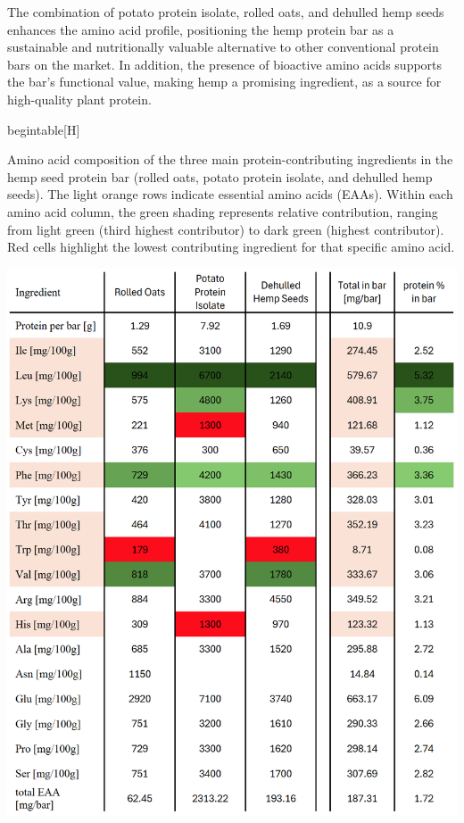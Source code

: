 \vspace{1em}
The combination of potato protein isolate, rolled oats, and dehulled hemp seeds enhances the amino acid profile, positioning the hemp protein bar as a sustainable and nutritionally valuable alternative to other conventional protein bars on the market. In addition, the presence of bioactive amino acids supports the bar’s functional value, making hemp a promising ingredient, as a source for high-quality plant protein.

begin{table}[H]
    \centering
    \begin{table}[H]
        \caption{Amino acid composition of the three main protein-contributing ingredients in the hemp seed protein bar (rolled oats, potato protein isolate, and dehulled hemp seeds). The light orange rows indicate essential amino acids (EAAs). Within each amino acid column, the green shading represents relative contribution, ranging from light green (third highest contributor) to dark green (highest contributor). Red cells highlight the lowest contributing ingredient for that specific amino acid.}
    \label{tab:df_amino_acids_01}
    \includegraphics[width=\linewidth]{Figures/tab_amino_acid_01.png}
\end{table}


